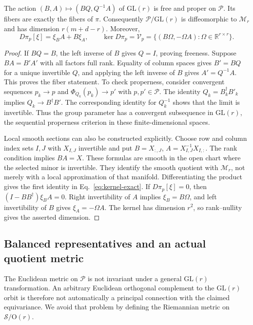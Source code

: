 \begin{theorem}
\label{thm:quotient-space}
The action $(B,A)\mapsto(BQ,Q^{-1}A)$ of $\mathrm{GL}(r)$ is free and
proper on $\mathcal P$. Its fibers are exactly the fibers of $\pi$.
Consequently $\mathcal P/\mathrm{GL}(r)$ is diffeomorphic to $\mathcal M_r$
and has dimension $r(m+d-r)$. Moreover,
\begin{equation}
 D\pi_p[\xi]=\xi_BA+B\xi_A,\qquad
 \ker D\pi_p=\mathcal V_p
 =\{(B\Omega,-\Omega A):\Omega\in\mathbb R^{r\times r}\}.
 \label{eq:kernel-exact}
\end{equation}
\end{theorem}
\begin{proof}
If $BQ=B$, the left inverse of $B$ gives $Q=I$, proving freeness.
Suppose $BA=B'A'$ with all factors full rank. Equality of column spaces gives
$B'=BQ$ for a unique invertible $Q$, and applying the left inverse of $B$
gives $A'=Q^{-1}A$. This proves the fiber statement. To check properness,
consider convergent sequences $p_k\to p$ and $\Phi_{Q_k}(p_k)\to p'$ with
$p,p'\in\mathcal P$. The identity $Q_k=B_k^\dagger B'_k$ implies
$Q_k\to B^\dagger B'$. The corresponding identity for $Q_k^{-1}$ shows
that the limit is invertible. Thus the group parameter has a convergent
subsequence in $\mathrm{GL}(r)$, the sequential properness criterion in
these finite-dimensional spaces.

Local smooth sections can also be constructed explicitly. Choose row and
column index sets $I,J$ with $X_{I,J}$ invertible and put
$B=X_{:,J}$, $A=X_{I,J}^{-1}X_{I,:}$. The rank condition implies $BA=X$.
These formulas are smooth in the open chart where the selected minor is
invertible. They identify the smooth quotient with $\mathcal M_r$, not merely
with a local approximation of that manifold. Differentiating the product gives
the first identity in Eq.~\eqref{eq:kernel-exact}. If $D\pi_p[\xi]=0$,
then $(I-BB^\dagger)\xi_BA=0$. Right invertibility of $A$ implies
$\xi_B=B\Omega$, and left invertibility of $B$ gives $\xi_A=-\Omega A$.
The kernel has dimension $r^2$, so rank--nullity gives the asserted dimension.
\end{proof}

\subsection{Balanced representatives and an actual quotient metric}
The Euclidean metric on $\mathcal P$ is not invariant under a general
$\mathrm{GL}(r)$ transformation. An arbitrary Euclidean orthogonal
complement to the $\mathrm{GL}(r)$ orbit is therefore not automatically
a principal connection with the claimed equivariance. We avoid that problem
by defining the Riemannian metric on $\mathcal S/\mathrm O(r)$.

